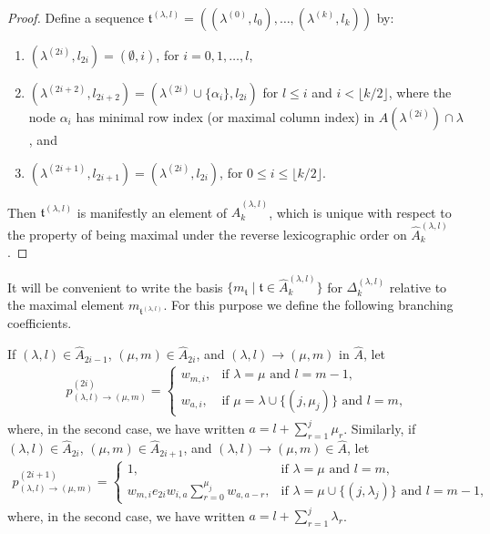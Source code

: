 \documentclass[11pt,a4paper,reqno,svgnames]{amsart}
\theoremstyle{plain}
\theoremstyle{definition}
\numberwithin{equation}{section}
\begin{document}
\begin{proof}
Define a sequence $\mathfrak{t}^{(\lambda,l)}=((\lambda^{(0)},l_0),\ldots,(\lambda^{(k)},l_k))$ by: 
\begin{enumerate}
\item $(\lambda^{(2i)},l_{2i})=(\emptyset,i)$, for $i=0,1,\ldots,l,$
\item  $(\lambda^{(2i+2)},l_{2i+2})= (\lambda^{(2i)}\cup \lbrace\alpha_{i}\rbrace,l_{2i}) $ for $l{\leqslant} i$ and $i<\lfloor k/2\rfloor$, where the node $\alpha_i$ has minimal row index (or maximal column index) in $A(\lambda^{(2i)})\cap\lambda$, and 
\item $(\lambda^{(2i+1)},l_{2i+1})=(\lambda^{(2i)},l_{2i})$, for $0{\leqslant} i{\leqslant} \lfloor k/2\rfloor$.
\end{enumerate}
Then $\mathfrak{t}^{(\lambda,l)}$ is manifestly an element of $\hat{A}_k^{(\lambda,l)}$, which is unique with respect to the property of being maximal under the reverse lexicographic order on $\hat{A}_k^{(\lambda,l)}$. 
\end{proof}

It will be convenient to write the basis $\lbrace m_\mathfrak{t}\mid \mathfrak{t}\in\hat{A}_k^{(\lambda,l)}\}$ for $\Delta^{(\lambda,l)}_{k}$ relative to the maximal element $m_{\mathfrak{t}^{(\lambda,l)}}$.  For this purpose we define the following branching coefficients. 

If $(\lambda,l)\in\hat{A}_{2i-1}$, $(\mu,m)\in\hat{A}_{2i}$, and $(\lambda,l)\to(\mu,m)$ in $\hat{A}$, let 
\begin{align*}
p^{(2i)}_{(\lambda,l)\to(\mu,m)}=
\begin{cases}
w_{m,i}, &\text{if $\lambda=\mu$ and $l=m-1$,}\\
w_{a,i}, &\text{if $\mu=\lambda\cup\lbrace (j,\mu_j)\rbrace$ and $l=m$,}
\end{cases}
\end{align*}
where, in the second case, we have written $a=l+\sum_{r=1}^{j}\mu_r$.  Similarly, if $(\lambda,l)\in\hat{A}_{2i}$, $(\mu,m)\in\hat{A}_{2i+1}$, and $(\lambda,l)\to(\mu,m)\in\hat{A}$, let 
\begin{align*}
p^{(2i+1)}_{(\lambda,l)\to(\mu,m)}=
\begin{cases}
1,&\text{if $\lambda=\mu$ and $l=m$,}\\
w_{m,i}e_{2i}w_{i,a}\sum_{r=0}^{\mu_j}w_{a,a-r},& \text{if $\lambda=\mu\cup\lbrace(j,\lambda_j)\rbrace$ and $l=m-1$,}
\end{cases}
\end{align*}
where, in the second case, we have written $a=l+\sum_{r=1}^{j}\lambda_r$. 
\end{document}
